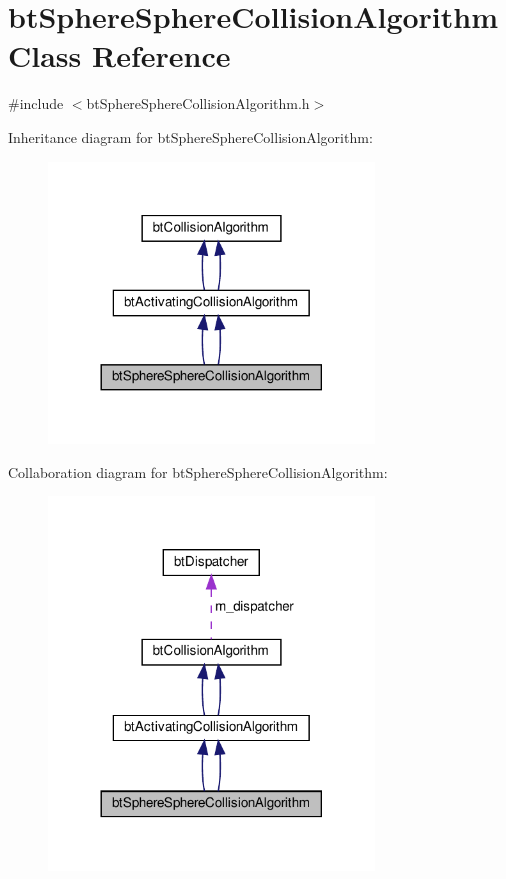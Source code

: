 \hypertarget{classbtSphereSphereCollisionAlgorithm}{}\section{bt\+Sphere\+Sphere\+Collision\+Algorithm Class Reference}
\label{classbtSphereSphereCollisionAlgorithm}


{\ttfamily \#include $<$bt\+Sphere\+Sphere\+Collision\+Algorithm.\+h$>$}



Inheritance diagram for bt\+Sphere\+Sphere\+Collision\+Algorithm\+:
\nopagebreak
\begin{figure}[H]
\begin{center}
\leavevmode
\includegraphics[width=245pt]{classbtSphereSphereCollisionAlgorithm__inherit__graph}
\end{center}
\end{figure}


Collaboration diagram for bt\+Sphere\+Sphere\+Collision\+Algorithm\+:
\nopagebreak
\begin{figure}[H]
\begin{center}
\leavevmode
\includegraphics[width=245pt]{classbtSphereSphereCollisionAlgorithm__coll__graph}
\end{center}
\end{figure}
